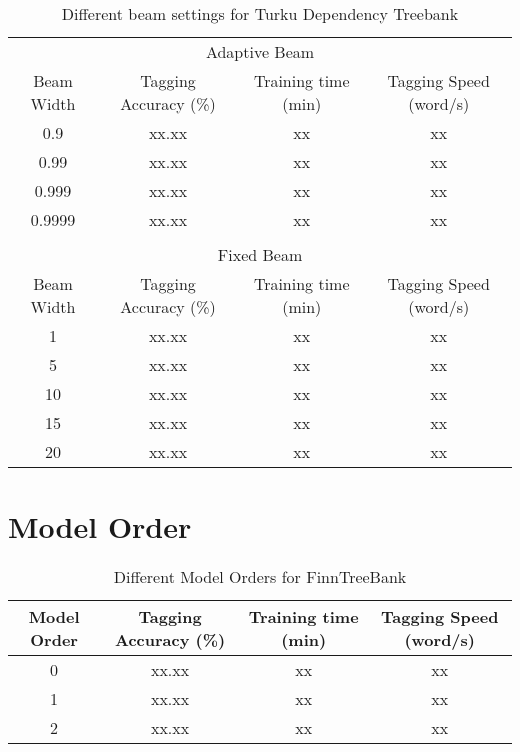 \begin{table}[htb!]
\begin{center}
\begin{tabular}{cccc}
\multicolumn{4}{c}{Adaptive Beam}\\
Beam Width & Tagging Accuracy (\%) & Training time (min) & Tagging Speed (word/s)\\
\hline
0.9        & xx.xx            & xx            & xx            \\
0.99       & xx.xx            & xx            & xx            \\
0.999      & xx.xx            & xx            & xx            \\
0.9999     & xx.xx            & xx            & xx            \\
\hline
           &                  &               &               \\
\multicolumn{4}{c}{Fixed Beam}\\
Beam Width & Tagging Accuracy (\%) & Training time (min) & Tagging Speed (word/s) \\
\hline
1        & xx.xx            & xx            & xx            \\
5        & xx.xx            & xx            & xx            \\
10       & xx.xx            & xx            & xx            \\
15       & xx.xx            & xx            & xx            \\
20       & xx.xx            & xx            & xx            \\
\end{tabular}
\caption{Different beam settings for Turku Dependency Treebank}
\end{center}
\end{table}

\section{Model Order}

\begin{table}[htb!]
\begin{center}
\begin{tabular}{cccc}
Model Order & Tagging Accuracy (\%) & Training time (min) & Tagging Speed (word/s)\\
\hline
0        & xx.xx            & xx            & xx            \\
1        & xx.xx            & xx            & xx            \\
2        & xx.xx            & xx            & xx            \\
\hline
\end{tabular}
\caption{Different Model Orders for FinnTreeBank}
\end{center}
\end{table}

